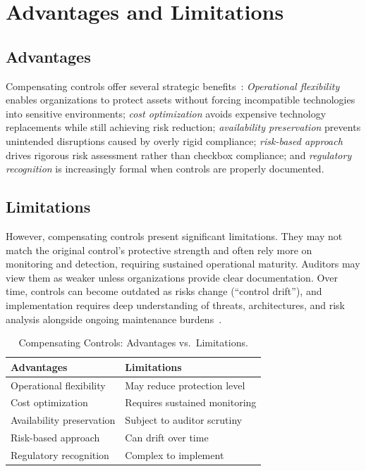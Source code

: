 \documentclass[sigconf,nonacm]{acmart}
\begin{document}
\section{Advantages and Limitations}

\subsection{Advantages}

Compensating controls offer several strategic benefits~\cite{reach2024,metricstream2024,
fortinet2024,nist2020controls,koleyjessen2024,techtarget2024}:
\textit{Operational flexibility} enables organizations to protect assets without forcing
incompatible technologies into sensitive environments; \textit{cost optimization} avoids
expensive technology replacements while still achieving risk reduction;
\textit{availability preservation} prevents unintended disruptions caused by overly rigid
compliance; \textit{risk-based approach} drives rigorous risk assessment rather than
checkbox compliance; and \textit{regulatory recognition} is increasingly formal when
controls are properly documented.

\subsection{Limitations}

However, compensating controls present significant limitations. They may not match the
original control's protective strength and often rely more on monitoring and detection,
requiring sustained operational maturity. Auditors may view them as weaker unless
organizations provide clear documentation. Over time, controls can become outdated
as risks change (``control drift''), and implementation requires deep understanding of
threats, architectures, and risk analysis alongside ongoing maintenance
burdens~\cite{metricstream2024,reach2024,naruc2024,fortinet2024,techtarget2024}.

\begin{table}[h]
\caption{Compensating Controls: Advantages vs.\ Limitations.}
\label{tab:tradeoffs}
\small
\begin{tabularx}{\columnwidth}{@{}XX@{}}
\toprule
\textbf{Advantages} & \textbf{Limitations} \\
\midrule
Operational flexibility  & May reduce protection level      \\
\addlinespace[2pt]
Cost optimization        & Requires sustained monitoring    \\
\addlinespace[2pt]
Availability preservation & Subject to auditor scrutiny     \\
\addlinespace[2pt]
Risk-based approach      & Can drift over time              \\
\addlinespace[2pt]
Regulatory recognition   & Complex to implement             \\
\bottomrule
\end{tabularx}
\end{table}
\end{document}
